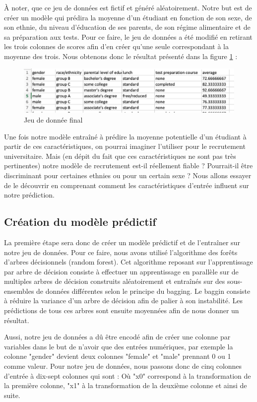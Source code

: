 À noter, que ce jeu de données est fictif et généré aléatoirement. Notre but est de créer un modèle qui prédira la moyenne d’un étudiant en fonction de son sexe, de son ethnie, du niveau d’éducation de ses parents, de son régime alimentaire et de sa préparation aux tests. Pour ce faire, le jeu de données a été modifié en retirant les trois colonnes de scores afin d'en créer qu'une seule correspondant à la moyenne des trois. Nous obtenons donc le résultat présenté dans la figure \ref{studentsPerformanceDataSetModif} : 
\begin{figure}[h]
    \includegraphics[scale=1]{src_img/StudentsPerformanceDataSetModif.png}
    \caption{Jeu de donnée final}
    \label{studentsPerformanceDataSetModif}
\end{figure}
Une fois notre modèle entraîné à prédire la moyenne potentielle d'un étudiant à partir de ces caractéristiques, on pourrai imaginer l'utiliser pour le recrutement universitaire. Mais (en dépit du fait que ces caractéristiques ne sont pas très pertinentes) notre modèle de recrutement est-il réellement fiable ? Pourrait-il être discriminant pour certaines ethnies ou pour un certain sexe ? Nous allons essayer de le découvrir en comprenant comment les caractéristiques d'entrée influent sur notre prédiction.

\subsection{Création du modèle prédictif}
La première étape sera donc de créer un modèle prédictif et de l'entraîner sur notre jeu de données. Pour ce faire, nous avons utilisé l'algorithme des forêts d'arbres décisionnels (random forest). Cet algorithme reposant sur l'apprentissage par arbre de décision consiste à effectuer un apprentissage en parallèle sur de multiples arbres de décision construits aléatoirement et entraînés sur des sous-ensembles de données différentes selon le principe du bagging. Le baggin consiste à réduire la variance d'un arbre de décision afin de palier à son instabilité. Les prédictions de tous ces arbres sont ensuite moyennées afin de nous donner un résultat.\par
Aussi, notre jeu de données a dû être encodé afin de créer une colonne par variables dans le but de n'avoir que des entrées numériques, par exemple la colonne "gender" devient deux colonnes "female" et "male" prennant 0 ou 1 comme valeur. Pour notre jeu de données, nous passons donc de cinq colonnes d'entrée à dix-sept colonnes qui sont : \medbreak
Où "x0" correspond à la transformation de la première colonne, "x1" à la transformation de la deuxième colonne et ainsi de suite.


